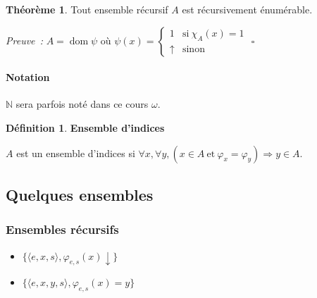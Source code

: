 \documentclass{book}
\theoremstyle{definition}
\newtheorem{theorem}{Théorème}
\newtheorem{definition}{Définition}
\numberwithin{lemma}{subsection}
\numberwithin{theorem}{subsection}
\numberwithin{definition}{subsection}
\numberwithin{proposition}{subsection}
\numberwithin{corollary}{subsection}
\numberwithin{property}{subsection}
\numberwithin{example}{subsection}
\numberwithin{heuristique}{subsection}
\numberwithin{scenario}{subsection}
\newenvironment{proofi} {\noindent\emph{Preuve~:}} {\hfill $\square$\vspace{0.2cm}}
\newcommand{\GodelFunc}[1]{\varphi_{#1}}
\newcommand{\Pairing}[1]{\langle #1 \rangle}
\DeclareMathOperator{\dom}{dom}
\begin{document}
            \begin{theorem}
                Tout ensemble récursif $A$ est récursivement énumérable.
            \end{theorem}
            
            \begin{proofi}
                $A = \dom \psi$ où $\psi(x) = \begin{cases}
                    1 & \mathrm{si}~\chi_A(x) = 1 \\
                    \uparrow & \mathrm{sinon}
                \end{cases}$
            \end{proofi}
            
            \paragraph{Notation} $\mathbb{N}$ sera parfois noté dans ce cours $\omega$.
            
            \begin{definition}\textbf{Ensemble d'indices}\label{def:ens_indices}
                \par $A$ est un ensemble d'indices si $\forall x, \forall y, (x \in A \mathrm{~et~} \GodelFunc{x}=\GodelFunc{y}) \Rightarrow y \in A$.
            \end{definition}
        
        \subsection{Quelques ensembles}
        \subsubsection{Ensembles récursifs}
            \begin{itemize}
                \item $\{\Pairing{e,x,s}, \GodelFunc{e,s}(x)\downarrow\} $
                \item $\{\Pairing{e,x,y,s}, \GodelFunc{e,s}(x) = y\} $
            \end{itemize}
            
\end{document}
